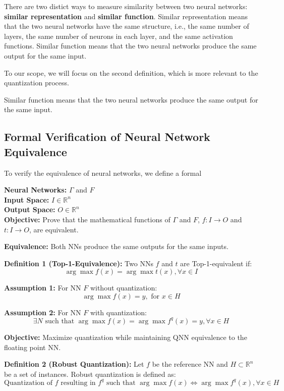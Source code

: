 There are two distict ways to measure similarity between two neural networks: \textbf{similar representation} and \textbf{similar function}. Similar representation means that the two neural networks have the same structure, i.e., the same number of layers, the same number of neurons in each layer, and the same activation functions. Similar function means that the two neural networks produce the same output for the same input.

To our scope, we will focus on the second definition, which is more relevant to the quantization process.

Similar function means that the two neural networks produce the same output for the same input. 



\subsection{Formal Verification of Neural Network Equivalence}

To verify the equivalence of neural networks, we define a formal 


\textbf{Neural Networks:} $\Gamma$ and $F$ \\
\textbf{Input Space:} $I \in \mathbb{R}^n$ \\
\textbf{Output Space:} $O \in \mathbb{R}^n$ \\

\textbf{Objective:} Prove that the mathematical functions of $\Gamma$ and $F$, $f:I \rightarrow O$ and $t:I\rightarrow O$, are equivalent.

\textbf{Equivalence:} Both NNs produce the same outputs for the same inputs.

\textbf{Definition 1 (Top-1-Equivalence):} Two NNs $f$ and $t$ are Top-1-equivalent if:
$$ \arg\max f(x) = \arg\max t(x), \forall x \in I $$

\textbf{Assumption 1:} For NN $F$ without quantization:
$$ \arg\max f(x) = y, \text{ for } x \in H $$

\textbf{Assumption 2:} For NN $F$ with quantization:
$$ \exists N \text{ such that } \arg\max f(x) = \arg\max f^q(x) = y, \forall x \in H $$



\textbf{Objective:} Maximize quantization while maintaining QNN equivalence to the floating point NN.

\textbf{Definition 2 (Robust Quantization):}
Let \( f \) be the reference NN and \( H \subset \mathbb{R}^n \) be a set of instances. Robust quantization is defined as:
\[ \text{Quantization of } f \text{ resulting in } f^q \text{ such that } \arg\max f(x) \Leftrightarrow \arg\max f^q(x), \forall x \in H \]

